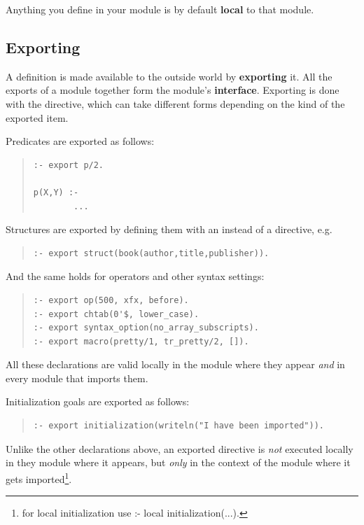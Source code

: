 Anything you define in your module is by default {\bf local} to that module.


\subsection{Exporting}

A definition is made available to the outside world by {\bf exporting} it.
All the exports of a module together form the module's {\bf interface}.
Exporting is done with the
directive, which can take
different forms depending on the kind of the exported item.

Predicates are exported as follows:
\begin{quote}\begin{verbatim}
:- export p/2.

p(X,Y) :-
        ...
\end{verbatim}\end{quote}

Structures are exported by defining them with an
instead of a
directive, e.g.
\begin{quote}\begin{verbatim}
:- export struct(book(author,title,publisher)).
\end{verbatim}\end{quote}

And the same holds for operators and other syntax settings:
\begin{quote}\begin{verbatim}
:- export op(500, xfx, before).
:- export chtab(0'$, lower_case).
:- export syntax_option(no_array_subscripts).
:- export macro(pretty/1, tr_pretty/2, []).
\end{verbatim}\end{quote}
All these declarations are valid locally in the module where they appear
{\em and} in every module that imports them.

Initialization goals are exported as follows:
\begin{quote}\begin{verbatim}
:- export initialization(writeln("I have been imported")).
\end{verbatim}\end{quote}
Unlike the other declarations above, an exported
 directive is {\em not} executed locally in
they module where it appears, but {\em only} in the context of the
module where it gets imported\footnote{
    for local initialization use :- local initialization(...).}.


